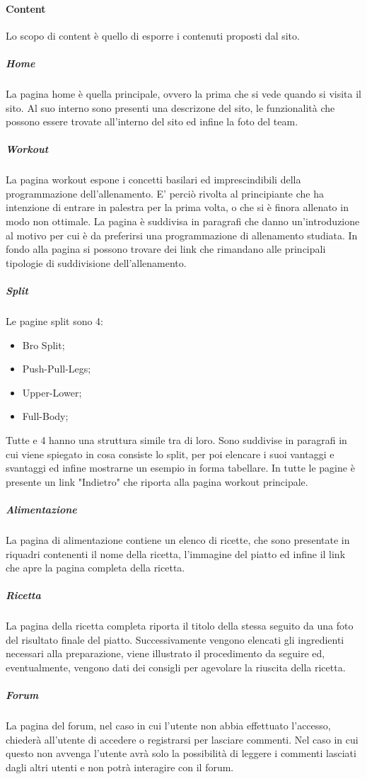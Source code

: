 \paragraph{Content}
Lo scopo di content è quello di esporre i contenuti proposti dal sito.
\subparagraph{Home}
La pagina home è quella principale, ovvero la prima che si vede quando si visita il sito. Al suo interno sono presenti una descrizone del sito, le funzionalità che possono essere trovate all'interno del sito ed infine la foto del team.
\subparagraph{Workout}
La pagina workout espone i concetti basilari ed imprescindibili della programmazione dell'allenamento. E' perciò rivolta al principiante che ha intenzione di entrare in palestra per la prima volta, o che si è finora allenato in modo non ottimale.
La pagina è suddivisa in paragrafi che danno un'introduzione al motivo per cui è da preferirsi una programmazione di allenamento studiata.
In fondo alla pagina si possono trovare dei link che rimandano alle principali tipologie di suddivisione dell'allenamento.
\subparagraph{Split}
Le pagine split sono 4:
\begin{itemize}
\item Bro Split;
\item Push-Pull-Legs;
\item Upper-Lower;
\item Full-Body;
\end{itemize}           
Tutte e 4 hanno una struttura simile tra di loro.
Sono suddivise in paragrafi in cui viene spiegato in cosa consiste lo split, per poi elencare i suoi vantaggi e svantaggi ed infine mostrarne un esempio in forma tabellare.
In tutte le pagine è presente un link "Indietro" che riporta alla pagina workout principale. 
\subparagraph{Alimentazione}
La pagina di alimentazione contiene un elenco di ricette, che sono presentate in riquadri contenenti il nome della ricetta, l’immagine
del piatto ed infine il link che apre la pagina completa della ricetta. 
\subparagraph{Ricetta}
La pagina della ricetta completa riporta il titolo della stessa seguito da una foto del risultato finale del piatto. Successivamente vengono elencati gli ingredienti necessari alla preparazione, viene illustrato il procedimento da seguire ed, eventualmente, vengono dati dei consigli per agevolare la riuscita della ricetta.
\subparagraph{Forum}
La pagina del forum, nel caso in cui l'utente non abbia effettuato l'accesso, chiederà all'utente di accedere o registrarsi per lasciare commenti. Nel caso in cui questo non avvenga l'utente avrà solo la possibilità di leggere i commenti lasciati dagli altri utenti e non potrà interagire con il forum.
